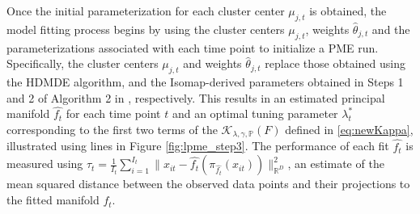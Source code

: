 \documentclass[12pt]{article}
\theoremstyle{definition}
\begin{document}
Once the initial parameterization for each cluster center $\mu_{j, t}$ is obtained, the model fitting process begins by using the cluster centers $\mu_{j, t}$, weights $\hat{\theta}_{j, t}$ and the parameterizations associated with each time point to initialize a PME run. Specifically, the cluster centers $\mu_{j, t}$ and weights $\hat{\theta}_{j, t}$ replace those obtained using the HDMDE algorithm, and the Isomap-derived parameters obtained in Steps 1 and 2 of Algorithm 2 in \cite{mengPrincipalManifoldEstimation2021}, respectively.
This results in an estimated principal manifold $\widehat{f_t}$ for each time point $t$ and an optimal tuning parameter $\lambda_t^*$ corresponding to the first two terms of the $\mathcal{K}_{\lambda, \gamma, \mathbb{P}}(F)$ defined in \eqref{eq:newKappa}, illustrated using lines in Figure \ref{fig:lpme_step3}. The performance of each fit $\widehat{f_t}$ is measured using $\tau_t = \frac{1}{I_t}\sum_{i=1}^{I_t}\| x_{it} - \widehat{f_t}(\pi_{\widehat{f_t}}(x_{it}))\|^{2}_{\mathbb{R}^D}$, an estimate of the mean squared distance between the observed data points and their projections to the fitted manifold $\widehat{f_t}$. 
\end{document}
